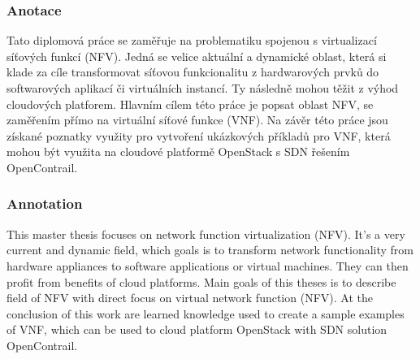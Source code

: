 \documentclass[12pt,a4paper,czech,czech,openright,cleardoubleempty,BCOR10mm,DIV11]{scrreprt}
\begin{document}
\subsubsection*{Anotace}

Tato diplomová práce se zaměřuje na problematiku spojenou s virtualizací síťových funkcí (NFV). Jedná se velice aktuální a dynamické oblast, která si klade za cíle transformovat síťovou funkcionalitu z hardwarových prvků do softwarových aplikací či virtuálních instancí. Ty následně mohou těžit z výhod cloudových platforem.
Hlavním cílem této práce je popsat oblast NFV, se zaměřením přímo na virtuální síťové funkce (VNF). Na závěr této práce jsou získané poznatky využity pro vytvoření ukázkových příkladů pro VNF, která mohou být využita na cloudové platformě OpenStack s SDN řešením OpenContrail.

\subsubsection*{Annotation}

This master thesis focuses on network function virtualization (NFV). It’s a very current and dynamic field, which goals is to transform network functionality from hardware appliances to software applications or virtual machines. They can then profit from benefits of cloud platforms. 
Main goals of this theses is to describe field of NFV with direct focus on virtual network function (NFV). At the conclusion of this work are learned knowledge used to create a sample examples of VNF, which can be used to cloud platform OpenStack with SDN solution OpenContrail.


\cleardoublepage{}

{\small %
}{\small \par}

\cleardoublepage{}\thispagestyle{empty}{\small 

\setcounter{secnumdepth}{4}
\setcounter{tocdepth}{3}%

\tableofcontents{}%
\cleardoublepage{}}{\small \par}








\cleardoublepage{}
\appendix
{}


\end{document}
